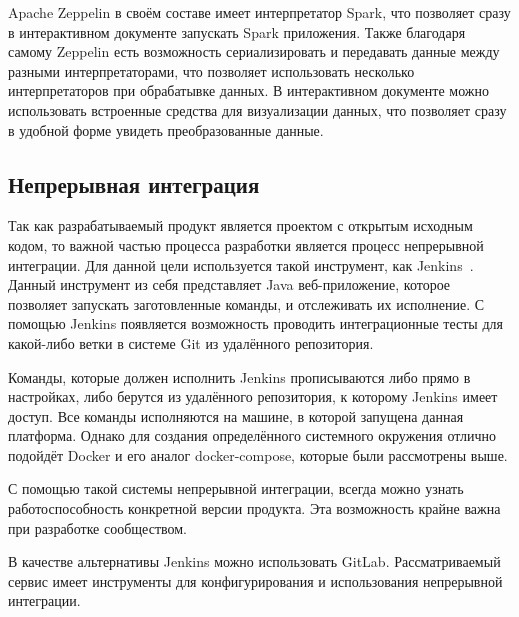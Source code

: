 Apache Zeppelin в своём составе имеет интерпретатор Spark, что позволяет сразу в интерактивном документе запускать Spark приложения.
Также благодаря самому Zeppelin есть возможность сериализировать и передавать данные между разными интерпретаторами, что позволяет использовать несколько интерпретаторов при обрабатывке данных.
В интерактивном документе можно использовать встроенные средства для визуализации данных, что позволяет сразу в удобной форме увидеть преобразованные данные.


\subsection{Непрерывная интеграция}

Так как разрабатываемый продукт является проектом с открытым исходным кодом, то важной частью процесса разработки является процесс непрерывной интеграции.
Для данной цели используется такой инструмент, как Jenkins~\cite{jenkins_documentation}.
Данный инструмент из себя представляет Java веб-приложение, которое позволяет запускать заготовленные команды, и отслеживать их исполнение.
С помощью Jenkins появляется возможность проводить интеграционные тесты для какой-либо ветки в системе Git из удалённого репозитория.

Команды, которые должен исполнить Jenkins прописываются либо прямо в настройках, либо берутся из удалённого репозитория, к которому Jenkins имеет доступ.
Все команды исполняются на машине, в которой запущена данная платформа.
Однако для создания определённого системного окружения отлично подойдёт Docker и его аналог docker-compose, которые были рассмотрены выше.

С помощью такой системы непрерывной интеграции, всегда можно узнать работоспособность конкретной версии продукта.
Эта возможность крайне важна при разработке сообществом.

В качестве альтернативы Jenkins можно использовать GitLab.
Рассматриваемый сервис имеет инструменты для конфигурирования и использования непрерывной интеграции.